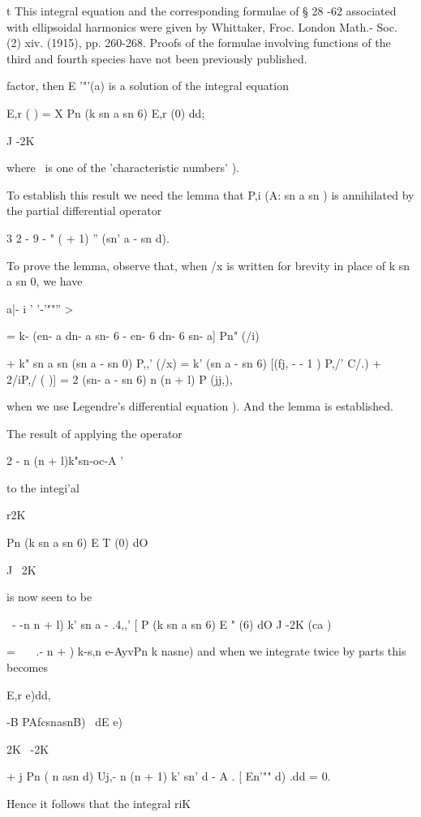 {{{{{{{t This integral equation and the corresponding formulae of § 28 -62
associated with ellipsoidal harmonics were given by Whittaker, Froc.
London Math.- Soc. (2) xiv. (1915), pp. 260-268. Proofs of the
formulae involving functions of the third and fourth species have not
been previously published.

%
%

factor, then E '"'(a) is a solution of the integral equation

E,r ( ) = X Pn (k sn a sn 6) E,r (0) dd;

J -2K

where \ is one of the 'characteristic numbers' ).

To establish this result we need the lemma that P,i (A: sn a sn ) is
annihilated by the partial differential operator

3 2 - 9 - " ( + 1) '' (sn' a - sn d).

To prove the lemma, observe that, when /x is written for brevity in
place of k sn a sn 0, we have

 a|- i ' '-'""'' >

= k- (en- a dn- a sn- 6 - en- 6 dn- 6 sn- a] Pn" (/i)

+ k" sn a sn (sn a - sn 0) P,,' (/x) = k' (sn a - sn 6) [(fj, - - 1 )
P,/' C/.) + 2/iP,/ ( )] = 2 (sn- a - sn 6) n (n + l) P (jj,),

when we use Legendre's differential equation ). And the lemma
is established.

The result of applying the operator

 2 - n (n + l)k"sn-oc-A '

to the integi'al

r2K

Pn (k sn a sn 6) E T (0) dO

J ~2K

is now seen to be

\ - -n n + l) k' sn a - .4,,' [ P (k sn a sn 6) E " (6) dO J -2K (ca
)

= \, \ \ .- n + ) k-s,n e-AyvPn k nasne) and when we integrate twice
by parts this becomes

E,r e)dd,

-B PAfcsnasnB) \ dE e)

2K \ -2K

+ j Pn ( n asn d) Uj,- n (n + 1) k' sn' d - A . [ En'"" d) .dd = 0.

Hence it follows that the integral riK

}}}}}}}
